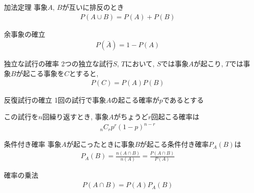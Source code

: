 \documentclass[aspectratio=169, 12pt]{beamer} %
\begin{document}
\begin{frame}{加法定理}
    事象$A$, $B$が互いに排反のとき
    \begin{eqnarray*}
        P(A\cup B)=P(A)+P(B)
    \end{eqnarray*}
\end{frame}
\begin{frame}{余事象の確立}
    \begin{eqnarray*}
        P(\bar{A})=1-P(A)
    \end{eqnarray*}
\end{frame}
\begin{frame}{独立な試行の確率}
    2つの独立な試行$S$, $T$において, $S$では事象$A$が起こり, $T$では事象$B$が起こる事象を$C$とすると,
    \begin{eqnarray*}
        P(C)=P(A)P(B)
    \end{eqnarray*}
\end{frame}
\begin{frame}{反復試行の確立}
    1回の試行で事象$A$の起こる確率が$p$であるとする\par
    この試行を$n$回繰り返すとき, 事象$A$がちょうど$r$回起こる確率は
    \begin{eqnarray*}
        _nC_rp^r(1-p)^{n-r}
    \end{eqnarray*}
\end{frame}
\begin{frame}{条件付き確率}
    事象$A$が起こったときに事象$B$が起こる条件付き確率$P_A(B)$は
    \begin{eqnarray*}
        P_A(B)=\frac{n(A\cap B)}{n(A)}=\frac{P(A\cap B)}{P(A)}
    \end{eqnarray*}
\end{frame}
\begin{frame}{確率の乗法}
    \begin{eqnarray*}
        P(A\cap B)=P(A)P_A(B)
    \end{eqnarray*}
\end{frame}
\end{document}
